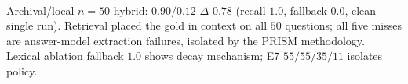 \begin{table}[t]\centering\caption{LongMemEval real $n{=}50$ — archival (primary) vs lexical ablation. $acc$ via 70b hybrid judge (meta-llama/llama-3.3-70b-instruct). Local BGE :8090 (fix 512tok $\to$ 1200c BATCH8); commodity answer model DeepSeek-V4-Flash; stream-windowed retrieval.}\label{tab:lme50}
\\{\footnotesize Archival/local $n{=}50$ hybrid: $0.90/0.12$ $\Delta$ $0.78$ (recall $1.0$, fallback $0.0$, clean single run). Retrieval placed the gold in context on all $50$ questions; all five misses are answer-model extraction failures, isolated by the PRISM methodology. Lexical ablation fallback $1.0$ shows decay mechanism; E7 $55/55/35/11$ isolates policy.}
\end{table}